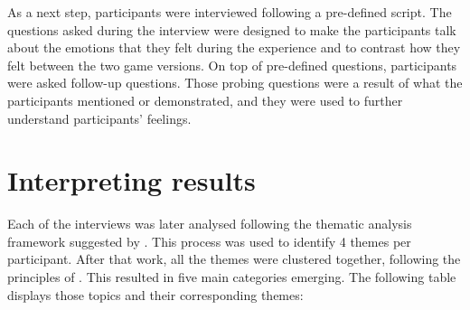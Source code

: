                                                            
As a next step, participants were interviewed following a pre-defined script.
The questions asked during the interview were designed to make the participants talk about the emotions that they felt during the experience and to contrast how they felt between the two game versions. On top of pre-defined questions, participants were asked follow-up questions. Those probing questions were a result of what the participants mentioned or demonstrated, and they were used to further understand participants' feelings.





\section{Interpreting results}


Each of the interviews was later analysed following the thematic analysis framework suggested by \textcite{mannResearchInterview2016}.
This process was used to identify 4 themes per participant. 
After that work, all the themes were clustered together, following the principles of \textcite{chuntieGroundedTheoryResearch2019}. This resulted in five main categories emerging. 
The following table displays those topics and their corresponding themes:



